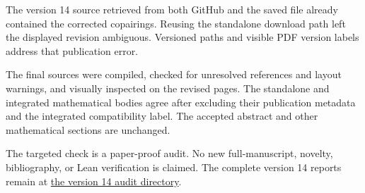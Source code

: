 \documentclass[10pt]{article}
\begin{document}
The version 14 source retrieved from both GitHub and the saved file already
contained the corrected copairings. Reusing the standalone download path left
the displayed revision ambiguous. Versioned paths and visible PDF version
labels address that publication error.

The final sources were compiled, checked for unresolved references and layout
warnings, and visually inspected on the revised pages. The standalone and
integrated mathematical bodies agree after excluding their publication metadata
and the integrated compatibility label. The accepted abstract and other
mathematical sections are unchanged.

The targeted check is a paper-proof audit. No new full-manuscript, novelty,
bibliography, or Lean verification is claimed. The complete version 14 reports
remain at
\href{https://github.com/flengyel/CategoricalEssentialIncompleteness/tree/main/Audit/2026-10-31-appendix-v14}{the version 14 audit directory}.
\end{document}
